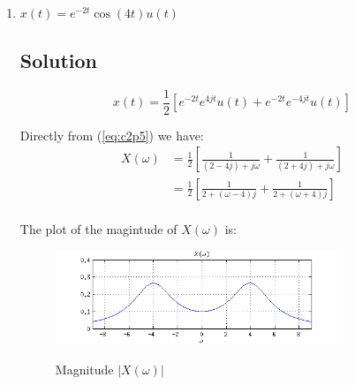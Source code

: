 \begin{enumerate}
\item $x(t) = e^{-2 t} \cos(4 t) u(t)$
\subsection*{Solution}

\begin{equation*}
x(t) = \frac{1}{2} \left[
	e^{-2t}e^{4j t} u(t) + e^{-2t}e^{-4j t}u(t) \right]
\end{equation*} 

Directly from (\ref{eq:c2p5}) we have:
\begin{equation*}
\begin{aligned}
X(\omega) &= \frac{1}{2} \left[
	\frac{1}{(2 - 4j) +j \omega} + 
	\frac{1}{(2 + 4j) +j \omega} \right] \\
          &= \frac{1}{2} \left[
	\frac{1}{2 + (\omega - 4)j} + 
	\frac{1}{2 + (\omega + 4)j} \right] \\
\end{aligned}
\end{equation*} 

The plot of the magintude of $X(\omega)$ is:

\begin{figure}[H]
\caption{Magnitude $|X(\omega)|$}
\centering
\includegraphics[width=0.8\textwidth]{figs/c2p6d.png}
\label{fig:c2p6d}
\end{figure} 

\end{enumerate} 
